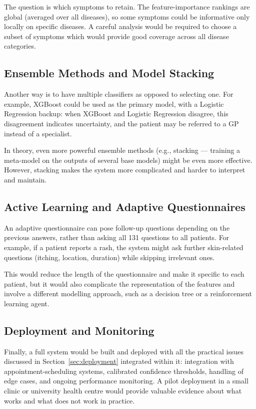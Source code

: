 The question is which symptoms to retain. The feature-importance rankings are global (averaged over all diseases), so some symptoms could be informative only locally on specific diseases. A careful analysis would be required to choose a subset of symptoms which would provide good coverage across all disease categories.

\subsection{Ensemble Methods and Model Stacking}

Another way is to have multiple classifiers as opposed to selecting one. For example, XGBoost could be used as the primary model, with a Logistic Regression backup: when XGBoost and Logistic Regression disagree, this disagreement indicates uncertainty, and the patient may be referred to a GP instead of a specialist.

In theory, even more powerful ensemble methods (e.g., stacking --- training a meta-model on the outputs of several base models) might be even more effective. However, stacking makes the system more complicated and harder to interpret and maintain.

\subsection{Active Learning and Adaptive Questionnaires}

An adaptive questionnaire can pose follow-up questions depending on the previous answers, rather than asking all 131 questions to all patients. For example, if a patient reports a rash, the system might ask further skin-related questions (itching, location, duration) while skipping irrelevant ones.

This would reduce the length of the questionnaire and make it specific to each patient, but it would also complicate the representation of the features and involve a different modelling approach, such as a decision tree or a reinforcement learning agent.

\subsection{Deployment and Monitoring}

Finally, a full system would be built and deployed with all the practical issues discussed in Section~\ref{sec:deployment} integrated within it: integration with appointment-scheduling systems, calibrated confidence thresholds, handling of edge cases, and ongoing performance monitoring. A pilot deployment in a small clinic or university health centre would provide valuable evidence about what works and what does not work in practice.